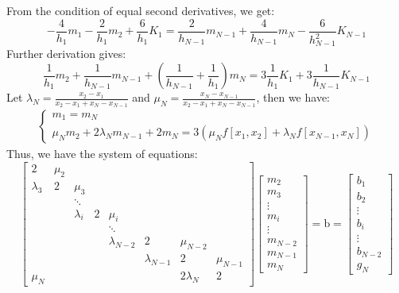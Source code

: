 \documentclass[a4paper]{article}
\begin{document}
From the condition of equal second derivatives, we get:
\begin{equation}
    -\frac{4}{h_1}m_1 - \frac{2}{h_1}m_2 + \frac{6}{h_1}K_1 = \frac{2}{h_{N-1}}m_{N-1}+\frac{4}{h_{N-1}}m_N -\frac{6}{h_{N-1}^2}K_{N-1}
\end{equation}
Further derivation gives:
\begin{equation}
  \frac{1}{h_1} m_2 + \frac{1}{h_{N-1}} m_{N-1} +(\frac{1}{h_{N-1}}+ \frac{1}{h_1})m_N = 3\frac{1}{h_1}K_1 +3\frac{1}{h_{N-1}}K_{N-1}
\end{equation}
Let $\lambda_N =\frac{x_2-x_1}{x_2-x_1 +x_N-x_{N-1}}$ and $\mu_N = \frac{x_N-x_{N-1}}{x_2-x_1 +x_N-x_{N-1}}$, then we have:
\begin{gather}
    \left\{
    \begin{array}{c}
    m_1 = m_N \\
        \mu_N m_2 + 2\lambda_N m_{N-1} + 2m_N = 3(\mu_Nf[x_1,x_2]+\lambda_N f[x_{N-1},x_N])
    \end{array}
    \right.
\end{gather}
Thus, we have the system of equations:
\begin{equation}
\begin{bmatrix}2&\mu_2\\\lambda_3&2&\mu_3\\&&\ddots\\&&\lambda_i&2&\mu_i\\&&&&\ddots\\&&&&\lambda_{N-2}&2&\mu_{N-2}\\&&&&&\lambda_{N-1}&2 &\mu_{N-1} \\
\mu_N&&&&&&2\lambda_N &2 \end{bmatrix}
\begin{bmatrix}m_2\\m_3\\\vdots\\m_i\\\vdots\\m_{N-2}\\m_{N-1}\\
m_N\end{bmatrix}=\mathrm{b} = \begin{bmatrix}
    b_1 \\
    b_2 \\
    \vdots \\
    b_i \\
    \vdots \\
    b_{N-2}\\
    g_N
\end{bmatrix}
\end{equation}
\end{document}
